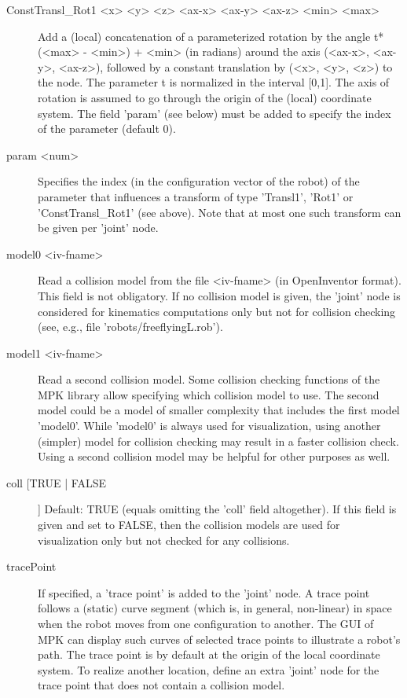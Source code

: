 \documentclass[letter,12pt]{article}
\begin{document}
\begin{description}
\begin{description}
\item[ConstTransl\_Rot1 <x> <y> <z> <ax-x> <ax-y> <ax-z> <min> <max>]
  Add a (local) concatenation of a parameterized rotation by the angle
  t*(<max> - <min>) + <min> (in radians) around the axis (<ax-x>,
  <ax-y>, <ax-z>), followed by a constant translation by (<x>, <y>,
  <z>) to the node.  The parameter t is normalized in the interval
  [0,1].  The axis of rotation is assumed to go through the origin of
  the (local) coordinate system.  The field 'param' (see below) must
  be added to specify the index of the parameter (default 0).
  
\item[param <num>] Specifies the index (in the configuration vector of
  the robot) of the parameter that influences a transform of type
  'Transl1', 'Rot1' or 'ConstTransl\_Rot1' (see above).  Note that at
  most one such transform can be given per 'joint' node.
  
\item[model0 <iv-fname>] Read a collision model from the file
  <iv-fname> (in OpenInventor format).  This field is not obligatory.
  If no collision model is given, the 'joint' node is considered for
  kinematics computations only but not for collision checking (see,
  e.g., file 'robots/freeflyingL.rob').
  
\item[model1 <iv-fname>] Read a second collision model.  Some
  collision checking functions of the MPK library allow specifying
  which collision model to use.  The second model could be a model of
  smaller complexity that includes the first model 'model0'.  While
  'model0' is always used for visualization, using another (simpler)
  model for collision checking may result in a faster collision check.
  Using a second collision model may be helpful for other purposes as
  well.
  
\item[coll [TRUE | FALSE]] Default: TRUE (equals omitting the 'coll'
  field altogether).  If this field is given and set to FALSE, then
  the collision models are used for visualization only but not checked
  for any collisions.
  
\item[tracePoint] If specified, a 'trace point' is added to the
  'joint' node.  A trace point follows a (static) curve segment (which
  is, in general, non-linear) in space when the robot moves from one
  configuration to another.  The GUI of MPK can display such curves of
  selected trace points to illustrate a robot's path.  The trace point
  is by default at the origin of the local coordinate system.  To
  realize another location, define an extra 'joint' node for the trace
  point that does not contain a collision model.


\end{description}
\end{description}
\end{document}
